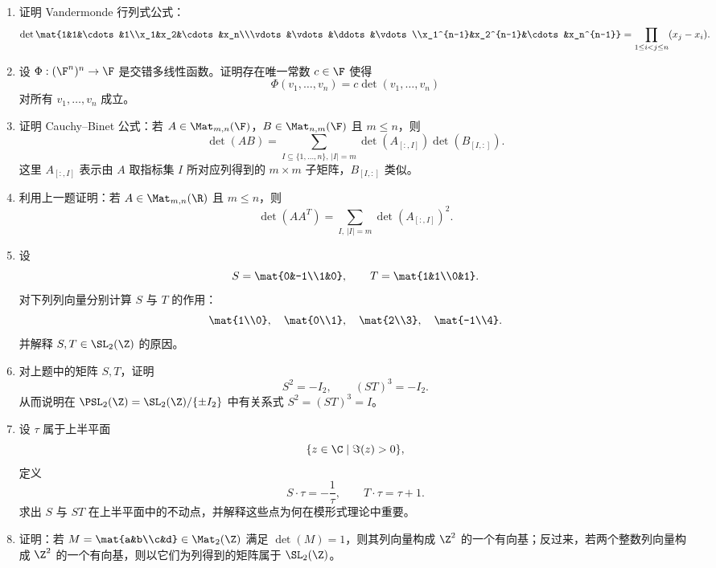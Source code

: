 \begin{enumerate}[label=\arabic*.,start=51]
  \item \hard 证明 Vandermonde 行列式公式：
  \[
  \det\mat{1&1&\cdots&1\\x_1&x_2&\cdots&x_n\\\vdots&\vdots&\ddots&\vdots\\x_1^{n-1}&x_2^{n-1}&\cdots&x_n^{n-1}}
  =\prod_{1\le i<j\le n}(x_j-x_i).
  \]

  \item \hard 设 $\Phi:(\F^n)^n\to\F$ 是交错多线性函数。证明存在唯一常数 $c\in\F$ 使得
  \[
  \Phi(v_1,\dots,v_n)=c\det(v_1,\dots,v_n)
  \]
  对所有 $v_1,\dots,v_n$ 成立。

  \item \hard 证明 Cauchy--Binet 公式：若 $A\in\Mat_{m,n}(\F)$，$B\in\Mat_{n,m}(\F)$ 且 $m\le n$，则
  \[
  \det(AB)=\sum_{I\subseteq\{1,\dots,n\},\,|I|=m}\det(A_{[:,I]})\det(B_{[I,:]}).
  \]
  这里 $A_{[:,I]}$ 表示由 $A$ 取指标集 $I$ 所对应列得到的 $m\times m$ 子矩阵，$B_{[I,:]}$ 类似。

  \item \hard 利用上一题证明：若 $A\in\Mat_{m,n}(\R)$ 且 $m\le n$，则
  \[
  \det(AA^T)=\sum_{I,\,|I|=m}\det(A_{[:,I]})^2.
  \]

  \item \hard 设
  \[
  S=\mat{0&-1\\1&0},\qquad T=\mat{1&1\\0&1}.
  \]
  对下列列向量分别计算 $S$ 与 $T$ 的作用：
  \[
  \mat{1\\0},\quad \mat{0\\1},\quad \mat{2\\3},\quad \mat{-1\\4}.
  \]
  并解释 $S,T\in\SL_2(\Z)$ 的原因。

  \item \hard 对上题中的矩阵 $S,T$，证明
  \[
  S^2=-I_2,
  \qquad
  (ST)^3=-I_2.
  \]
  从而说明在 $\PSL_2(\Z)=\SL_2(\Z)/\{\pm I_2\}$ 中有关系式 $S^2=(ST)^3=I$。

  \item \hard 设 $\tau$ 属于上半平面
  \[
  \{z\in\C\mid \Im(z)>0\},
  \]
  定义
  \[
  S\cdot\tau=-\frac{1}{\tau},\qquad T\cdot\tau=\tau+1.
  \]
  求出 $S$ 与 $ST$ 在上半平面中的不动点，并解释这些点为何在模形式理论中重要。

  \item \hard 证明：若 $M=\mat{a&b\\c&d}\in\Mat_2(\Z)$ 满足 $\det(M)=1$，则其列向量构成 $\Z^2$ 的一个有向基；反过来，若两个整数列向量构成 $\Z^2$ 的一个有向基，则以它们为列得到的矩阵属于 $\SL_2(\Z)$。


\end{enumerate}
